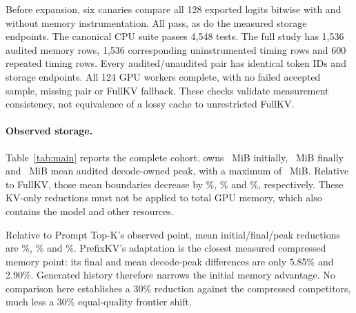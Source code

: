 Before expansion, six canaries compare all 128 exported logits bitwise
with and without memory instrumentation. All pass, as do the measured
storage endpoints. The canonical CPU suite passes 4,548 tests. The full
study has 1,536 audited memory rows, 1,536 corresponding uninstrumented
timing rows and 600 repeated timing rows. Every audited/unaudited pair
has identical token IDs and storage endpoints. All 124 GPU workers
complete, with no failed accepted sample, missing pair or FullKV fallback.
These checks validate measurement consistency, not equivalence of a lossy
cache to unrestricted FullKV.

\begin{table}[t]
\centering\small
\setlength{\tabcolsep}{6pt}

\caption{Completed 256-image COCO operating points: initial/final memory
and peak mean/max in MiB; full-request latency quantiles in seconds. Memory
columns are means except the explicitly shown maximum. R+A means local
reimplementation plus precision/storage adaptation, not official execution.
\textbf{Realized byte budgets differ.} FullKV latency is descriptive only.
No row is omitted for unfavorable quality or latency.}
\label{tab:main}
\end{table}

\paragraph{Observed storage.}
Table~\ref{tab:main} reports the complete cohort. \Evi{} owns
\EviInitial~MiB initially, \EviFinal~MiB finally and
\EviPeak~MiB mean audited decode-owned peak, with a maximum of
\EviMaxPeak~MiB. Relative to FullKV, those mean boundaries decrease by
\FullInitialReduction\%, \FullFinalReduction\% and \FullPeakReduction\%,
respectively. These KV-only reductions must not be applied to total GPU
memory, which also contains the model and other resources.

Relative to Prompt Top-K's observed point, mean initial/final/peak
reductions are \TopInitialReduction\%, \TopFinalReduction\% and
\TopPeakReduction\%. PrefixKV's adaptation is the closest measured
compressed memory point: its final and mean decode-peak differences are
only 5.85\% and 2.90\%. Generated history therefore narrows the initial
memory advantage. No comparison here establishes a 30\% reduction against
the compressed competitors, much less a 30\% equal-quality frontier shift.

